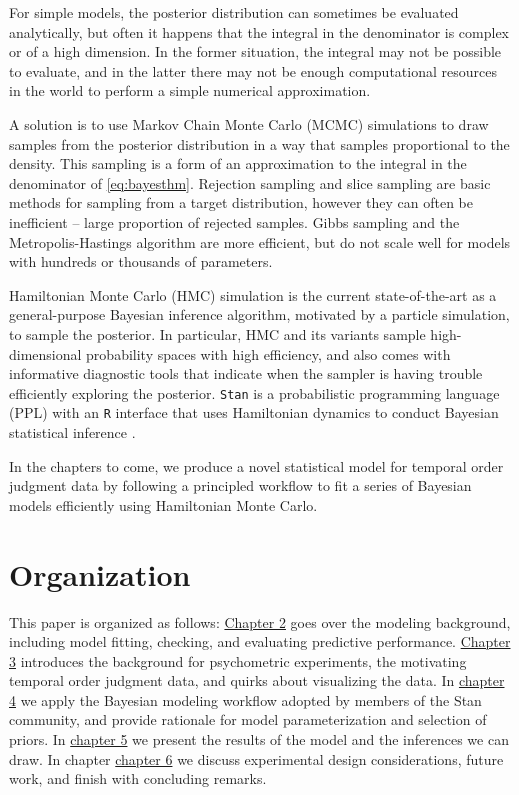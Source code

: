 \documentclass[11pt, oneside, openany]{scrbook}
\begin{document}
For simple models, the posterior distribution can sometimes be evaluated analytically, but often it happens that the integral in the denominator is complex or of a high dimension. In the former situation, the integral may not be possible to evaluate, and in the latter there may not be enough computational resources in the world to perform a simple numerical approximation.

A solution is to use Markov Chain Monte Carlo (MCMC) simulations to draw samples from the posterior distribution in a way that samples proportional to the density. This sampling is a form of an approximation to the integral in the denominator of \eqref{eq:bayesthm}. Rejection sampling \citep{gilks1992adaptive} and slice sampling \citep{neal2003slice} are basic methods for sampling from a target distribution, however they can often be inefficient -- large proportion of rejected samples. Gibbs sampling and the Metropolis-Hastings algorithm are more efficient, but do not scale well for models with hundreds or thousands of parameters.

Hamiltonian Monte Carlo (HMC) simulation is the current state-of-the-art as a general-purpose Bayesian inference algorithm, motivated by a particle simulation, to sample the posterior. In particular, HMC and its variants sample high-dimensional probability spaces with high efficiency, and also comes with informative diagnostic tools that indicate when the sampler is having trouble efficiently exploring the posterior. \texttt{Stan} is a probabilistic programming language (PPL) with an \texttt{R} interface that uses Hamiltonian dynamics to conduct Bayesian statistical inference \citep{R-rstan}.

In the chapters to come, we produce a novel statistical model for temporal order judgment data by following a principled workflow to fit a series of Bayesian models efficiently using Hamiltonian Monte Carlo.

\hypertarget{organization}{%
\section{Organization}\label{organization}}

This paper is organized as follows: \protect\hyperlink{methods}{Chapter 2} goes over the modeling background, including model fitting, checking, and evaluating predictive performance. \protect\hyperlink{data}{Chapter 3} introduces the background for psychometric experiments, the motivating temporal order judgment data, and quirks about visualizing the data. In \protect\hyperlink{application}{chapter 4} we apply the Bayesian modeling workflow adopted by members of the Stan community, and provide rationale for model parameterization and selection of priors. In \protect\hyperlink{results}{chapter 5} we present the results of the model and the inferences we can draw. In chapter \protect\hyperlink{conclusion}{chapter 6} we discuss experimental design considerations, future work, and finish with concluding remarks.
\end{document}

